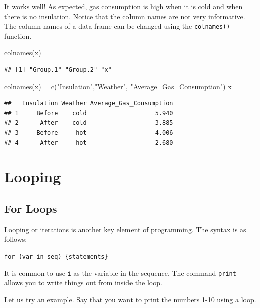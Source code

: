 \documentclass[
]{article}
\newenvironment{Shaded}{\begin{snugshade}}{\end{snugshade}}
\newcommand{\FunctionTok}[1]{\textcolor[rgb]{0.00,0.00,0.00}{#1}}
\newcommand{\NormalTok}[1]{#1}
\newcommand{\OtherTok}[1]{\textcolor[rgb]{0.56,0.35,0.01}{#1}}
\newcommand{\StringTok}[1]{\textcolor[rgb]{0.31,0.60,0.02}{#1}}
\begin{document}
It works well! As expected, gas consumption is high when it is cold and
when there is no insulation. Notice that the column names are not very
informative. The column names of a data frame can be changed using the
\texttt{colnames()} function.

\begin{Shaded}
\begin{Highlighting}[]
\FunctionTok{colnames}\NormalTok{(x)}
\end{Highlighting}
\end{Shaded}

\begin{verbatim}
## [1] "Group.1" "Group.2" "x"
\end{verbatim}

\begin{Shaded}
\begin{Highlighting}[]
\FunctionTok{colnames}\NormalTok{(x) }\OtherTok{=} \FunctionTok{c}\NormalTok{(}\StringTok{"Insulation"}\NormalTok{,}\StringTok{"Weather"}\NormalTok{, }\StringTok{"Average\_Gas\_Consumption"}\NormalTok{)}
\NormalTok{x}
\end{Highlighting}
\end{Shaded}

\begin{verbatim}
##   Insulation Weather Average_Gas_Consumption
## 1     Before    cold                   5.940
## 2      After    cold                   3.885
## 3     Before     hot                   4.006
## 4      After     hot                   2.680
\end{verbatim}

\hypertarget{looping}{%
\section{Looping}\label{looping}}

\hypertarget{for-loops}{%
\subsection{For Loops}\label{for-loops}}

Looping or iterations is another key element of programming. The syntax
is as follows:

\texttt{for\ (var\ in\ seq)\ \{statements\}}

It is common to use \texttt{i} as the variable in the sequence. The
command \texttt{print} allows you to write things out from inside the
loop.

Let us try an example. Say that you want to print the numbers 1-10 using
a loop.
\end{document}
